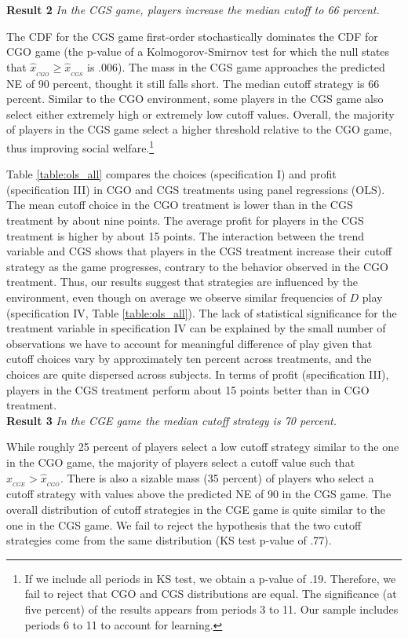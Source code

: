 \documentclass[12pt, letterpaper]{article}
\theoremstyle{plain}
\begin{document}
\noindent \textbf{Result 2}
\textit{In the CGS game, players increase the median cutoff to 66 percent.}

The CDF for the CGS game first-order stochastically dominates the CDF for CGO game (the p-value of a Kolmogorov-Smirnov test for which the null states that $\hat{x}_{_{CGO}} \geq \hat{x}_{_{CGS}}$ is .006). The mass in the CGS game approaches the predicted NE of 90 percent, thought it still falls short. The median cutoff strategy is 66 percent. Similar to the CGO environment, some players in the CGS game also select either extremely high or extremely low cutoff values. Overall, the majority of players in the CGS game select a higher threshold relative to the CGO game, thus improving social welfare.\footnote{If we include all periods in KS test, we obtain a p-value of .19. Therefore, we fail to reject that CGO and CGS distributions are equal. The significance (at five percent) of the results appears from periods 3 to 11. Our sample includes periods 6 to 11 to account for learning.}

Table \ref{table:ols_all} compares the choices (specification I) and profit (specification III) in CGO and CGS treatments using panel regressions (OLS). The mean cutoff choice in the CGO treatment is lower than in the CGS treatment by about nine points. The average profit for players in the CGS treatment is higher by about 15 points. The interaction between the trend variable and CGS shows that players in the CGS treatment increase their cutoff strategy as the game progresses, contrary to the behavior observed in the CGO treatment. Thus, our results suggest that strategies are influenced by the environment, even though on average we observe similar frequencies of $D$ play (specification IV, Table \ref{table:ols_all}). The lack of statistical significance for the treatment variable in specification IV can be explained by the small number of observations we have to account for meaningful difference of play given that cutoff choices vary by approximately ten percent across treatments, and the choices are quite dispersed across subjects. In terms of profit (specification III), players in the CGS treatment perform about 15 points better than in CGO treatment. \\ 


\noindent \textbf{Result 3}
\textit{In the CGE game the median cutoff strategy is 70 percent.}

While roughly 25 percent of players select a low cutoff strategy similar to the one in the CGO game, the majority of players select a cutoff value such that $\hat{x}_{_{CGE}}> \hat{x}_{_{CGO}}$. There is also a sizable mass (35 percent) of players who select a cutoff strategy with values above the predicted NE of 90 in the CGS game. The overall distribution of cutoff strategies in the CGE game is quite similar to the one in the CGS game. We fail to reject the hypothesis that the two cutoff strategies come from the same distribution (KS test p-value of .77).
\end{document}
